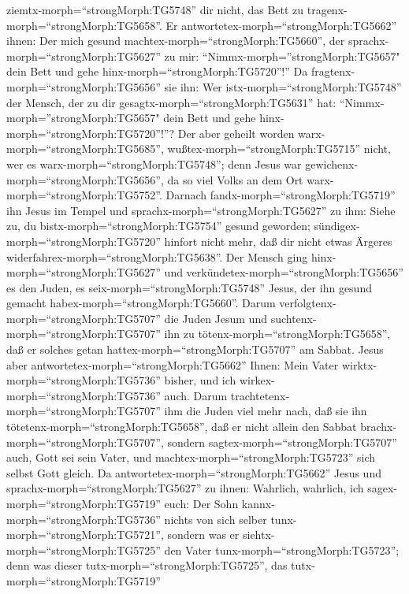 ziemtx-morph=``strongMorph:TG5748'' dir nicht, das Bett zu
tragenx-morph=``strongMorph:TG5658''.  Er
antwortetex-morph=``strongMorph:TG5662'' ihnen: Der mich gesund
machtex-morph=``strongMorph:TG5660'', der
sprachx-morph=``strongMorph:TG5627'' zu mir:
``Nimmx-morph=''strongMorph:TG5657" dein Bett und gehe
hinx-morph=``strongMorph:TG5720''!''  Da
fragtenx-morph=``strongMorph:TG5656'' sie ihn: Wer
istx-morph=``strongMorph:TG5748'' der Mensch, der zu dir
gesagtx-morph=``strongMorph:TG5631'' hat:
``Nimmx-morph=''strongMorph:TG5657" dein Bett und gehe
hinx-morph=``strongMorph:TG5720''!''?  Der aber geheilt
worden warx-morph=``strongMorph:TG5685'',
wußtex-morph=``strongMorph:TG5715'' nicht, wer es
warx-morph=``strongMorph:TG5748''; denn Jesus war
gewichenx-morph=``strongMorph:TG5656'', da so viel Volks an dem Ort
warx-morph=``strongMorph:TG5752''.  Darnach
fandx-morph=``strongMorph:TG5719'' ihn Jesus im Tempel und
sprachx-morph=``strongMorph:TG5627'' zu ihm: Siehe zu, du
bistx-morph=``strongMorph:TG5754'' gesund geworden;
sündigex-morph=``strongMorph:TG5720'' hinfort nicht mehr, daß dir nicht
etwas Ärgeres widerfahrex-morph=``strongMorph:TG5638''. 
Der Mensch ging hinx-morph=``strongMorph:TG5627'' und
verkündetex-morph=``strongMorph:TG5656'' es den Juden, es
seix-morph=``strongMorph:TG5748'' Jesus, der ihn gesund gemacht
habex-morph=``strongMorph:TG5660''.  Darum
verfolgtenx-morph=``strongMorph:TG5707'' die Juden Jesum und
suchtenx-morph=``strongMorph:TG5707'' ihn zu
tötenx-morph=``strongMorph:TG5658'', daß er solches getan
hattex-morph=``strongMorph:TG5707'' am Sabbat.  Jesus aber
antwortetex-morph=``strongMorph:TG5662'' Ihnen: Mein Vater
wirktx-morph=``strongMorph:TG5736'' bisher, und ich
wirkex-morph=``strongMorph:TG5736'' auch.  Darum
trachtetenx-morph=``strongMorph:TG5707'' ihm die Juden viel mehr nach,
daß sie ihn tötetenx-morph=``strongMorph:TG5658'', daß er nicht allein
den Sabbat brachx-morph=``strongMorph:TG5707'', sondern
sagtex-morph=``strongMorph:TG5707'' auch, Gott sei sein Vater, und
machtex-morph=``strongMorph:TG5723'' sich selbst Gott gleich.
 Da antwortetex-morph=``strongMorph:TG5662'' Jesus und
sprachx-morph=``strongMorph:TG5627'' zu ihnen: Wahrlich, wahrlich, ich
sagex-morph=``strongMorph:TG5719'' euch: Der Sohn
kannx-morph=``strongMorph:TG5736'' nichts von sich selber
tunx-morph=``strongMorph:TG5721'', sondern was er
siehtx-morph=``strongMorph:TG5725'' den Vater
tunx-morph=``strongMorph:TG5723''; denn was dieser
tutx-morph=``strongMorph:TG5725'', das tutx-morph=``strongMorph:TG5719''
